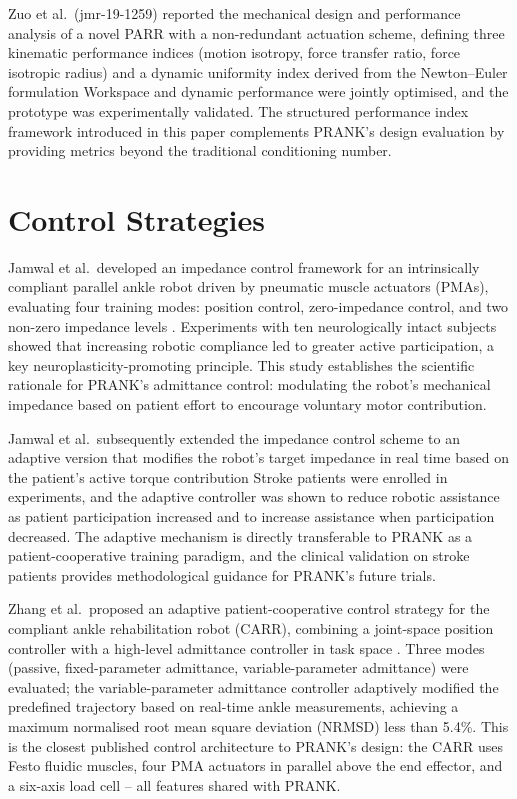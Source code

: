 Zuo et al.\ (jmr-19-1259) reported the mechanical design and performance analysis of a novel PARR with a non-redundant actuation scheme, defining three kinematic performance indices (motion isotropy, force transfer ratio, force isotropic radius) and a dynamic uniformity index derived from the Newton--Euler formulation %
Workspace and dynamic performance were jointly optimised, and the prototype was experimentally validated.
The structured performance index framework introduced in this paper complements PRANK's design evaluation by providing metrics beyond the traditional conditioning number.

\section{Control Strategies}

Jamwal et al.\ developed an impedance control framework for an intrinsically compliant parallel ankle robot driven by pneumatic muscle actuators (PMAs), evaluating four training modes: position control, zero-impedance control, and two non-zero impedance levels \cite{Jamwal2016}.
Experiments with ten neurologically intact subjects showed that increasing robotic compliance led to greater active participation, a key neuroplasticity-promoting principle.
This study establishes the scientific rationale for PRANK's admittance control: modulating the robot's mechanical impedance based on patient effort to encourage voluntary motor contribution.

Jamwal et al.\ subsequently extended the impedance control scheme to an adaptive version that modifies the robot's target impedance in real time based on the patient's active torque contribution %
Stroke patients were enrolled in experiments, and the adaptive controller was shown to reduce robotic assistance as patient participation increased and to increase assistance when participation decreased.
The adaptive mechanism is directly transferable to PRANK as a patient-cooperative training paradigm, and the clinical validation on stroke patients provides methodological guidance for PRANK's future trials.

Zhang et al.\ proposed an adaptive patient-cooperative control strategy for the compliant ankle rehabilitation robot (CARR), combining a joint-space position controller with a high-level admittance controller in task space \cite{Zhang2018}.
Three modes (passive, fixed-parameter admittance, variable-parameter admittance) were evaluated; the variable-parameter admittance controller adaptively modified the predefined trajectory based on real-time ankle measurements, achieving a maximum normalised root mean square deviation (NRMSD) less than 5.4\%.
This is the closest published control architecture to PRANK's design: the CARR uses Festo fluidic muscles, four PMA actuators in parallel above the end effector, and a six-axis load cell -- all features shared with PRANK.


